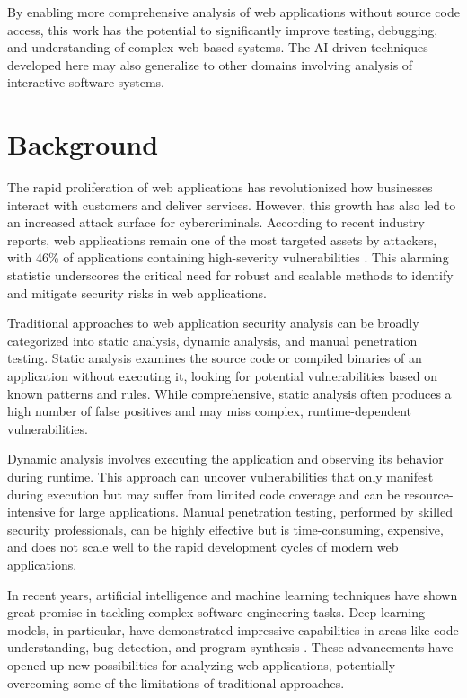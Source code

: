 By enabling more comprehensive analysis of web applications without source code access, this work has the potential to significantly improve testing, debugging, and understanding of complex web-based systems. The AI-driven techniques developed here may also generalize to other domains involving analysis of interactive software systems.

\section{Background}
The rapid proliferation of web applications has revolutionized how businesses interact with customers and deliver services. However, this growth has also led to an increased attack surface for cybercriminals. According to recent industry reports, web applications remain one of the most targeted assets by attackers, with 46\% of applications containing high-severity vulnerabilities \cite{gan2013anomaly}. This alarming statistic underscores the critical need for robust and scalable methods to identify and mitigate security risks in web applications.

Traditional approaches to web application security analysis can be broadly categorized into static analysis, dynamic analysis, and manual penetration testing. Static analysis examines the source code or compiled binaries of an application without executing it, looking for potential vulnerabilities based on known patterns and rules. While comprehensive, static analysis often produces a high number of false positives and may miss complex, runtime-dependent vulnerabilities.

Dynamic analysis involves executing the application and observing its behavior during runtime. This approach can uncover vulnerabilities that only manifest during execution but may suffer from limited code coverage and can be resource-intensive for large applications. Manual penetration testing, performed by skilled security professionals, can be highly effective but is time-consuming, expensive, and does not scale well to the rapid development cycles of modern web applications.

In recent years, artificial intelligence and machine learning techniques have shown great promise in tackling complex software engineering tasks. Deep learning models, in particular, have demonstrated impressive capabilities in areas like code understanding, bug detection, and program synthesis \cite{mohammed2021effective}. These advancements have opened up new possibilities for analyzing web applications, potentially overcoming some of the limitations of traditional approaches.

